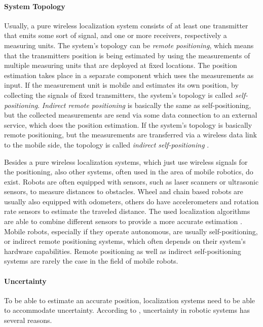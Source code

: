 \paragraph{System Topology}
Usually, a pure wireless localization system consists of at least one transmitter that emits some sort of signal, and one or more receivers, respectively a measuring units. The system's topology can be \emph{remote positioning}, which means that the transmitters position is being estimated by using the measurements of multiple measuring units that are deployed at fixed locations. The position estimation takes place in a separate component which uses the measurements as input. If the measurement unit is mobile and estimates its own position, by collecting the signals of fixed transmitters, the system's topology is called \emph{self-positioning}. \emph{Indirect remote positioning} is basically the same as self-positioning, but the collected measurements are send via some data connection to an external service, which does the position estimation. If the system's topology is basically remote positioning, but the measurements are transferred via a wireless data link to the mobile side, the topology is called \emph{indirect self-positioning} \citep{IEEE:survey_wireless_indoor_pos}.

Besides a pure wireless localization systems, which just use wireless signals for the positioning, also other systems, often used in the area of mobile robotics, do exist. Robots are often equipped with sensors, such as laser scanners or ultrasonic sensors, to measure distances to obstacles. Wheel and chain based robots are usually also equipped with odometers, others do have accelerometers and rotation rate sensors to estimate the traveled distance. The used localization algorithms are able to combine different sensors to provide a more accurate estimation \citep{thrun:prob_robo}. Mobile robots, especially if they operate autonomous, are usually self-positioning, or indirect remote positioning systems, which often depends on their system's hardware capabilities. Remote positioning as well as indirect self-positioning systems are rarely the case in the field of mobile robots.

\paragraph{Uncertainty}
To be able to estimate an accurate position, localization systems need to be able to accommodate uncertainty. According to \citet{thrun:prob_robo}, uncertainty in robotic systems has several reasons.

